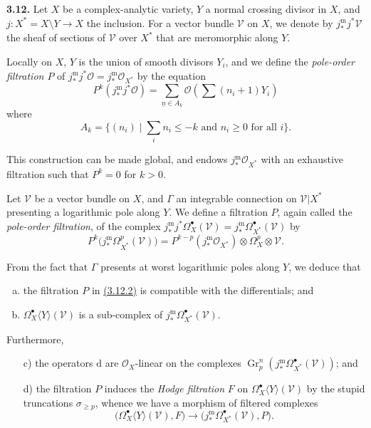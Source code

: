 \documentclass{report}
\newenvironment{rmenv}[1]
  {\phantomsection\par\medskip\noindent\textbf{#1.}\rmfamily}
  {\medskip}
\renewcommand{\cal}[1]{{\mathcal{#1}}}
\newcommand{\dd}{\mathrm{d}}
\renewcommand{\geq}{\geqslant}
\renewcommand{\leq}{\leqslant}
\DeclareMathOperator{\Gr}{Gr}
\newcommand{\oldpage}[1]{\marginpar{\footnotesize$\Big\vert$ \textit{p.~#1}}}
\begin{document}
\begin{rmenv}{3.12}
\label{II.3.12}
  Let $X$ be a complex-analytic variety, $Y$ a normal crossing divisor in $X$, and $j\colon X^*=X\setminus Y\to X$ the inclusion.
  For a vector bundle $\cal{V}$ on $X$, we denote by $j_*^\mathrm{m}j^*\cal{V}$ the sheaf of sections of $\cal{V}$ over $X^*$ that are meromorphic along $Y$.

\oldpage{80}
  Locally on $X$, $Y$ is the union of smooth divisors $Y_i$, and we define the \emph{pole-order filtration $P$} of $j_*^\mathrm{m}j^*\cal{O}=j_*^\mathrm{m}\cal{O}_{X^*}$ by the equation
  \[
  \label{II.3.12.1}
    P^k(j_*^\mathrm{m}j^*\cal{O})
    = \sum_{\underline{n}\in A_k}\cal{O}(\sum(n_i+1)Y_i)
  \tag{3.12.1}
  \]
  where
  \[
    A_k = \big\{
      (n_i) \mid \mbox{$\sum_i n_i\leq-k$ and $n_i\geq0$ for all $i$}
    \big\}.
  \]

  This construction can be made global, and endows $j_*^\mathrm{m}\cal{O}_{X^*}$ with an exhaustive filtration such that $P^k=0$ for $k>0$.

  Let $\cal{V}$ be a vector bundle on $X$, and $\Gamma$ an integrable connection on $\cal{V}|X^*$ presenting a logarithmic pole along $Y$.
  We define a filtration $P$, again called the \emph{pole-order filtration}, of the complex $j_*^\mathrm{m}j^*\Omega_X^\bullet(\cal{V})=j_*^\mathrm{m}\Omega_{X^*}^\bullet(\cal{V})$ by
  \[
  \label{II.3.12.2}
    P^k\big(j_*^\mathrm{m}\Omega_{X^*}^p(\cal{V})\big)
    = P^{k-p}(j_*^\mathrm{m}\cal{O}_{X^*})\otimes\Omega_X^p\otimes\cal{V}.
  \tag{3.12.2}
  \]

  From the fact that $\Gamma$ presents at worst logarithmic poles along $Y$, we deduce that
  \begin{enumerate}[a)]
    \item the filtration $P$ in \hyperref[II.3.12.2]{(3.12.2)} is compatible with the differentials; and
    \item $\Omega_X^\bullet\langle Y\rangle(\cal{V})$ is a sub-complex of $j_*^\mathrm{m}\Omega_{X^*}^\bullet(\cal{V})$.
  \end{enumerate}

  Furthermore,
  \begin{enumerate}
    \item[{\rm c)}] the operators $\dd$ are $\cal{O}_X$-linear on the complexes $\Gr_p^n(j_*^\mathrm{m}\Omega_{X^*}^\bullet(\cal{V}))$; and
    \item[{\rm d)}] the filtration $P$ induces the \emph{Hodge filtration} $F$ on $\Omega_X^\bullet\langle Y\rangle(\cal{V})$ by the stupid truncations $\sigma_{\geq p}$, whence we have a morphism of filtered complexes
    \[
    \label{II.3.12.3}
      \big(\Omega_X^\bullet\langle Y\rangle(\cal{V}), F\big)
      \to
      \big(j_*^\mathrm{m}\Omega_{X^*}^\bullet(\cal{V}), P\big).
    \tag{3.12.3}
    \]
  \end{enumerate}
\end{rmenv}
\end{document}
